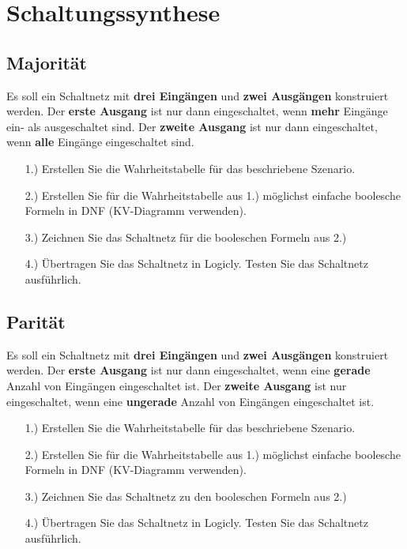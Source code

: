 
\part{Schaltungssynthese}
\label{part-schaltungssynthese}

\togglefalse{image}
\togglefalse{imagehover}

\chapter{Majorität}
\label{chapter-majoritaet}

\begin{exercise}
Es soll ein Schaltnetz mit \textbf{drei Eingängen} und \textbf{zwei Ausgängen} konstruiert werden. Der \textbf{erste Ausgang} ist nur dann eingeschaltet, wenn \textbf{mehr} Eingänge ein- als ausgeschaltet sind. Der \textbf{zweite Ausgang} ist nur dann eingeschaltet, wenn \textbf{alle} Eingänge eingeschaltet sind.

\begin{enumerate}
\item[1.)] Erstellen Sie die Wahrheitstabelle für das beschriebene Szenario.
\item[2.)] Erstellen Sie für die Wahrheitstabelle aus 1.) möglichst einfache boolesche Formeln in \ac{DNF} (\ac{KV}-Diagramm verwenden).
\item[3.)] Zeichnen Sie das Schaltnetz für die booleschen Formeln aus 2.)
\item[4.)] Übertragen Sie das Schaltnetz in Logicly. Testen Sie das Schaltnetz ausführlich.
\end{enumerate}
\end{exercise}


\newpage

\chapter{Parität}
\label{chapter-paritaet}

\begin{exercise}
Es soll ein Schaltnetz mit \textbf{drei Eingängen} und \textbf{zwei Ausgängen} konstruiert werden. Der \textbf{erste Ausgang} ist nur dann eingeschaltet, wenn eine \textbf{gerade} Anzahl von Eingängen eingeschaltet ist. Der \textbf{zweite Ausgang} ist nur eingeschaltet, wenn eine \textbf{ungerade} Anzahl von Eingängen eingeschaltet ist.

\begin{enumerate}
\item[1.)] Erstellen Sie die Wahrheitstabelle für das beschriebene Szenario.
\item[2.)] Erstellen Sie für die Wahrheitstabelle aus 1.) möglichst einfache boolesche Formeln in \ac{DNF} (\ac{KV}-Diagramm verwenden).
\item[3.)] Zeichnen Sie das Schaltnetz zu den booleschen Formeln aus 2.)
\item[4.)] Übertragen Sie das Schaltnetz in Logicly. Testen Sie das Schaltnetz ausführlich.
\end{enumerate}
\end{exercise}


\newpage